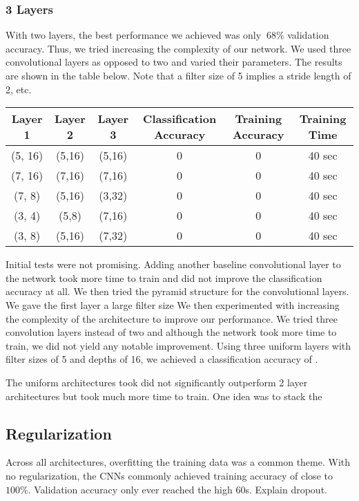 \documentclass[10pt,twoside]{article}
\begin{document}
\subsubsection{3 Layers}
With two layers, the best performance we achieved was only $~68\%$ validation accuracy. Thus, we tried increasing the complexity of our network. We used three convolutional layers as opposed to two and varied their parameters. The results are shown in the table below.
Note that a filter size of 5 implies a stride length of 2, etc.

\begin{center}
 \begin{tabular}{||c c c c c c||} 
 \hline
 Layer 1 & Layer 2 & Layer 3 & Classification Accuracy & Training Accuracy & Training Time \\ [0.5ex] 
 \hline\hline
 (5, 16) & (5,16) & (5,16) & 0 & 0 & 40 sec \\ 
 \hline
 (7, 16) & (7,16) & (7,16) & 0 & 0 & 40 sec \\ 
 \hline
 (7, 8)  & (5,16) & (3,32) & 0 & 0 & 40 sec \\ 
 \hline
 (3, 4)  & (5,8) & (7,16) & 0 & 0 & 40 sec \\ 
 \hline
 (3, 8)  & (5,16) & (7,32) & 0 & 0 & 40 sec \\ 
 \hline
\end{tabular}
\end{center}

Initial tests were not promising. Adding another baseline convolutional layer to the network took more time to train and did not improve the classification accuracy at all. We then tried the pyramid structure for the convolutional layers. We gave the first layer a large filter size
We then experimented with increasing the complexity of the architecture to improve our performance. We tried three convolution layers instead of two and although the network took more time to train, we did not yield any notable improvement. Using three uniform layers with filter sizes of 5 and depths of 16, we achieved a classification accuracy of .

The uniform architectures took did not significantly outperform 2 layer architectures but took much more time to train. One idea was to stack the 

\subsection{Regularization}
Across all architectures, overfitting the training data was a common theme. With no regularization, the CNNs commonly achieved training accuracy of close to $100\%$. Validation accuracy only ever reached the high 60s. 
Explain dropout.
\end{document}
